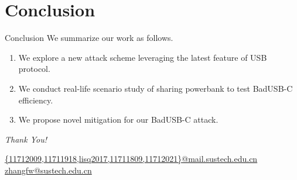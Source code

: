 \documentclass{beamer}
\begin{document}
\section{Conclusion}
\begin{frame}{Conclusion}
	We summarize our work as follows.
	\begin{enumerate}
		\item We explore a new attack scheme leveraging the latest feature of USB protocol.
		\item We conduct real-life scenario study of sharing powerbank to test BadUSB-C efficiency.
		\item We propose novel mitigation for our BadUSB-C attack.
	\end{enumerate}
\end{frame}
\begin{frame}
	\vfill
	\begin{center}
		\Large
		\emph{Thank You!}
	\end{center}
	\vfill
	 \url{{11712009,11711918,lisq2017,11711809,11712021}@mail.sustech.edu.cn}
		\\ \url{zhangfw@sustech.edu.cn}
\end{frame}

\begin{frame}[allowframebreaks]
	
	
\end{frame}
\end{document}
